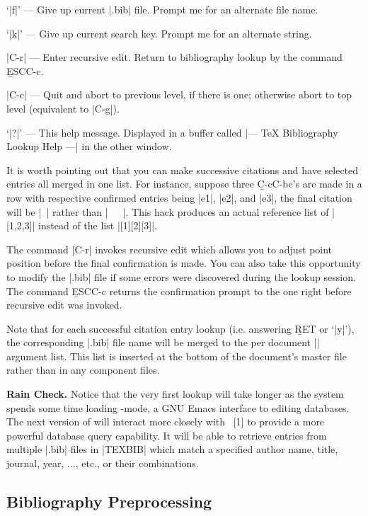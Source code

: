 {\begin{env}
\begin{minipage}
{shown.}
\item{\bull}{`|f|' --- Give up current |.bib| file.  Prompt me for an alternate
file name.}
\item{\bull}{`|k|' --- Give up current search key.  Prompt me for an alternate
string.}
\item{\bull}{|C-r| --- Enter recursive edit.  Return to bibliography lookup
by the command {\b ESC{\s}C-c}.}
\item{\bull}{|C-c| --- Quit and abort to previous level, if there is one;
otherwise abort to top level (equivalent to |C-g|).}
\item{\bull}{`|?|' --- This help message. Displayed in a buffer called
|--- TeX Bibliography Lookup Help ---| in the other window.}

It is worth pointing out that you can make successive citations
and have selected entries all merged in one list.
For instance, suppose three {\b C-c{\s}C-b{\s}c}'s
are made in a row with respective confirmed entries being
|e1|, |e2|, and |e3|, the final citation will be
|~\cite{e1,e2,e3}| rather than |~\cite{e1}~\cite{e2}~\cite{e3}|.
This hack produces an actual reference list of |[1,2,3]| instead of 
the list |[1][2][3]|.

The command |C-r| invokes recursive edit which allows you to adjust
point position before the final confirmation is made.
You can also take this opportunity
to modify the |.bib| file if some errors were discovered during
the lookup session.  The command {\b ESC{\s}C-c} returns the confirmation
prompt to the one right before recursive edit was invoked.

Note that for each successful citation entry lookup (i.e. answering
{\b RET} or `|y|'), the corresponding |.bib| file name will be
merged to the per document || argument list.
This list is inserted at the bottom of the document's master file rather
than in any component files.

{\bf Rain Check.}  Notice that the very first lookup will take longer as
the system spends some time loading {\BibTeX}-mode, a
GNU Emacs interface to editing {\BibTeX} databases.
The next version of {\TM} will interact more closely with {\BM}~[1]
to provide a more powerful database
query capability.  It will be able to retrieve
entries from multiple |.bib| files in |TEXBIB| which match a specified
author name, title, journal, year, ..., etc., or their combinations.


\subsection{Bibliography Preprocessing}


\end{minipage}
\end{env}}
